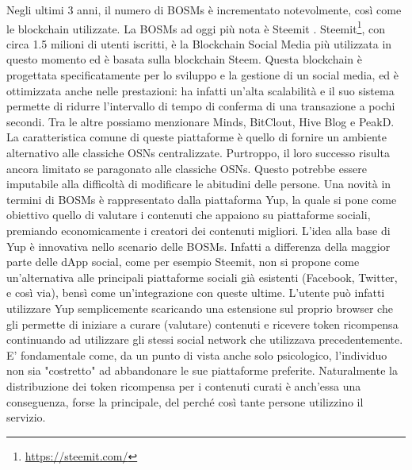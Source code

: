 Negli ultimi 3 anni, il numero di BOSMs è incrementato notevolmente, così come le blockchain utilizzate. La BOSMs ad oggi più nota è Steemit \cite{guidi2020steem,guidi2021socioeconomic}. Steemit\footnote{\url{https://steemit.com/}}, con circa 1.5 milioni di utenti iscritti, è la Blockchain Social Media più utilizzata in questo momento ed è basata sulla blockchain Steem. Questa blockchain è progettata specificatamente per lo sviluppo e la gestione di un social media, ed è ottimizzata anche nelle prestazioni: ha infatti un'alta scalabilità e il suo sistema permette di ridurre l'intervallo di tempo di conferma di una transazione a pochi secondi.
Tra le altre possiamo menzionare Minds, BitClout, Hive Blog e PeakD.
La caratteristica comune di queste piattaforme è quello di fornire un ambiente alternativo alle classiche OSNs centralizzate. Purtroppo, il loro successo risulta ancora limitato se paragonato alle classiche OSNs. Questo potrebbe essere imputabile alla difficoltà di modificare le abitudini delle persone. Una novità in termini di BOSMs è rappresentato dalla piattaforma Yup, la quale si pone come obiettivo quello di valutare i contenuti che appaiono su piattaforme sociali, premiando economicamente i creatori dei contenuti migliori. L'idea alla base di Yup è innovativa nello scenario delle BOSMs. Infatti a differenza della maggior parte delle dApp social, come per esempio Steemit, non si propone come un'alternativa alle principali piattaforme sociali già esistenti (Facebook, Twitter, e così via), bensì come un'integrazione con queste ultime. L'utente può infatti utilizzare Yup semplicemente scaricando una estensione sul proprio browser che gli permette di iniziare a curare (valutare) contenuti e ricevere token ricompensa continuando ad utilizzare gli stessi social network che utilizzava precedentemente. E' fondamentale come, da un punto di vista anche solo psicologico, l'individuo non sia "costretto" ad abbandonare le sue piattaforme preferite. Naturalmente la distribuzione dei token ricompensa per i contenuti curati è anch'essa una conseguenza, forse la principale, del perché così tante persone utilizzino il servizio.

